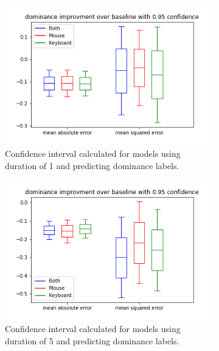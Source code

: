 \documentclass[../main.tex]{subfiles}
\begin{document}
\begin{figure}[!h]
    \begin{subfigure}[b]{0.31\textwidth}
        \centering
        \includegraphics[width=\textwidth]{figures/results/interval_difference/1/1_dominance_0.95.png}
        \captionsetup{justification=centering}
        \caption{Confidence interval calculated for models using duration of 1 and predicting dominance labels.}
    \end{subfigure}
    \hfill
    \begin{subfigure}[b]{0.31\textwidth}
        \centering
        \includegraphics[width=\textwidth]{figures/results/interval_difference/5/5_dominance_0.95.png}
        \captionsetup{justification=centering}
        \caption{Confidence interval calculated for models using duration of 5 and predicting dominance labels.}
    \end{subfigure}
    \begin{subfigure}[b]{0.31\textwidth}

\end{subfigure}
\end{figure}
\end{document}
